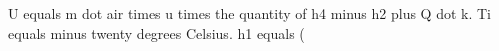 U equals m dot air times u times the quantity of h4 minus h2 plus Q dot k. Ti equals minus twenty degrees Celsius. h1 equals (